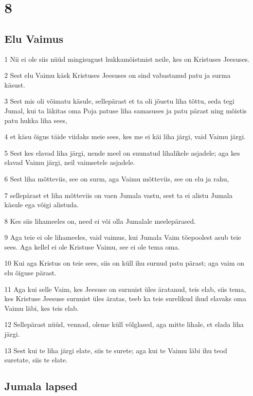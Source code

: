 \chapter{8}

\section*{Elu Vaimus}

\par 1 Nii ei ole siis nüüd mingisugust hukkamõistmist neile, kes on Kristuses Jeesuses.
\par 2 Sest elu Vaimu käsk Kristuses Jeesuses on sind vabastanud patu ja surma käsust.
\par 3 Sest mis oli võimatu käsule, sellepärast et ta oli jõuetu liha tõttu, seda tegi Jumal, kui ta läkitas oma Poja patuse liha samasuses ja patu pärast ning mõistis patu hukka liha sees,
\par 4 et käsu õigus täide viidaks meie sees, kes me ei käi liha järgi, vaid Vaimu järgi.
\par 5 Sest kes elavad liha järgi, nende meel on suunatud lihalikele asjadele; aga kes elavad Vaimu järgi, neil vaimsetele asjadele.
\par 6 Sest liha mõtteviis, see on surm, aga Vaimu mõtteviis, see on elu ja rahu,
\par 7 sellepärast et liha mõtteviis on vaen Jumala vastu, sest ta ei alistu Jumala käsule ega võigi alistuda.
\par 8 Kes siis lihameeles on, need ei või olla Jumalale meelepärased.
\par 9 Aga teie ei ole lihameeles, vaid vaimus, kui Jumala Vaim tõepoolest asub teie sees. Aga kellel ei ole Kristuse Vaimu, see ei ole tema oma.
\par 10 Kui aga Kristus on teie sees, siis on küll ihu surnud patu pärast; aga vaim on elu õiguse pärast.
\par 11 Aga kui selle Vaim, kes Jeesuse on surnuist üles äratanud, teis elab, siis tema, kes Kristuse Jeesuse surnuist üles äratas, teeb ka teie surelikud ihud elavaks oma Vaimu läbi, kes teis elab.
\par 12 Sellepärast nüüd, vennad, oleme küll võlglased, aga mitte lihale, et elada liha järgi.
\par 13 Sest kui te liha järgi elate, siis te surete; aga kui te Vaimu läbi ihu teod suretate, siis te elate.

\section*{Jumala lapsed}

